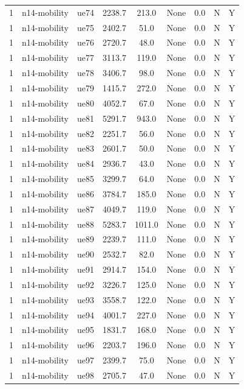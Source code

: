 \begin{table}[ht]
\begin{tabular}{|c|c|c|c|c|c|c|c|c|}
1 & n14-mobility & ue74 & 2238.7 & 213.0 & None & 0.0 & N & Y \\
1 & n14-mobility & ue75 & 2402.7 & 51.0 & None & 0.0 & N & Y \\
1 & n14-mobility & ue76 & 2720.7 & 48.0 & None & 0.0 & N & Y \\
1 & n14-mobility & ue77 & 3113.7 & 119.0 & None & 0.0 & N & Y \\
1 & n14-mobility & ue78 & 3406.7 & 98.0 & None & 0.0 & N & Y \\
1 & n14-mobility & ue79 & 1415.7 & 272.0 & None & 0.0 & N & Y \\
1 & n14-mobility & ue80 & 4052.7 & 67.0 & None & 0.0 & N & Y \\
1 & n14-mobility & ue81 & 5291.7 & 943.0 & None & 0.0 & N & Y \\
1 & n14-mobility & ue82 & 2251.7 & 56.0 & None & 0.0 & N & Y \\
1 & n14-mobility & ue83 & 2601.7 & 50.0 & None & 0.0 & N & Y \\
1 & n14-mobility & ue84 & 2936.7 & 43.0 & None & 0.0 & N & Y \\
1 & n14-mobility & ue85 & 3299.7 & 64.0 & None & 0.0 & N & Y \\
1 & n14-mobility & ue86 & 3784.7 & 185.0 & None & 0.0 & N & Y \\
1 & n14-mobility & ue87 & 4049.7 & 119.0 & None & 0.0 & N & Y \\
1 & n14-mobility & ue88 & 5283.7 & 1011.0 & None & 0.0 & N & Y \\
1 & n14-mobility & ue89 & 2239.7 & 111.0 & None & 0.0 & N & Y \\
1 & n14-mobility & ue90 & 2532.7 & 82.0 & None & 0.0 & N & Y \\
1 & n14-mobility & ue91 & 2914.7 & 154.0 & None & 0.0 & N & Y \\
1 & n14-mobility & ue92 & 3226.7 & 125.0 & None & 0.0 & N & Y \\
1 & n14-mobility & ue93 & 3558.7 & 122.0 & None & 0.0 & N & Y \\
1 & n14-mobility & ue94 & 4001.7 & 227.0 & None & 0.0 & N & Y \\
1 & n14-mobility & ue95 & 1831.7 & 168.0 & None & 0.0 & N & Y \\
1 & n14-mobility & ue96 & 2203.7 & 196.0 & None & 0.0 & N & Y \\
1 & n14-mobility & ue97 & 2399.7 & 75.0 & None & 0.0 & N & Y \\
1 & n14-mobility & ue98 & 2705.7 & 47.0 & None & 0.0 & N & Y \\

\end{tabular}
\end{table}
